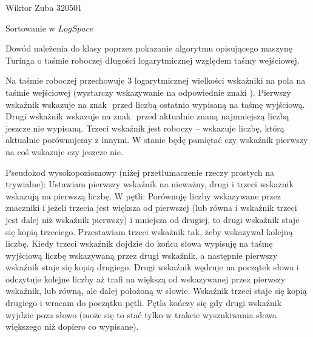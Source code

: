 \documentclass{article}
\begin{document}
Wiktor Zuba 320501\newline

Sortowanie w $LogSpace$\newline

Dowód należenia do klasy poprzez pokazanie algorytmu opisującego
maszynę Turinga o taśmie roboczej długości logarytmicznej względem taśmy wejściowej.\newline

Na taśmie roboczej przechowuje 3 logarytmicznej wielkości wskaźniki na pola na taśmie wejściowej
(wystarczy wskazywanie na odpowiednie znaki \officialeuro).\newline
Pierwszy wskaźnik wskazuje na znak \officialeuro$ $ przed liczbą ostatnio wypisaną na taśmę wyjściową.\newline
Drugi wskażnik wskazuje na znak \officialeuro$ $ przed aktualnie znaną najmniejszą liczbą jeszcze nie wypisaną.\newline
Trzeci wskaźnik jest roboczy -- wskazuje liczbę, którą aktualnie porównujemy z innymi.\newline
W stanie będę pamiętać czy wskaźnik pierwszy na coś wskazuje czy jeszcze nie.\newline

Pseudokod wysokopoziomowy (niżej przetłumaczenie rzeczy prostych na trywialne):\newline
Ustawiam pierwszy wskaźnik na nieważny, drugi i trzeci wskażnik wskazują na pierwszą liczbę.\newline
W pętli:\newline
Porównuję liczby wskazywane przez znaczniki i jeżeli trzecia jest większa od pierwszej (lub równa i wskaźnik trzeci jest dalej niż wskaźnik pierwszy)
i mniejsza od drugiej, to drugi wskaźnik staje się kopią trzeciego.\newline
Przestawiam trzeci wskażnik tak, żeby wskazywał kolejną liczbę.
Kiedy trzeci wskaźnik dojdzie do końca słowa wypisuję na taśmę wyjściową liczbę wskazywaną przez drugi wskaźnik,
a następnie pierwszy wskaźnik staje się kopią drugiego.
Drugi wskaźnik wędruje na początek słowa i odczytuje kolejne liczby aż trafi na większą od wskazywanej przez pierwszy wskaźnik,
lub równą, ale dalej położoną w słowie. Wskaźnik trzeci staje się kopią drugiego i wracam do początku pętli.
Pętla kończy się gdy drugi wskaźnik wyjdzie poza słowo (może się to stać tylko w trakcie wyszukiwania słowa większego niż dopiero co wypisane).\newline
\end{document}
